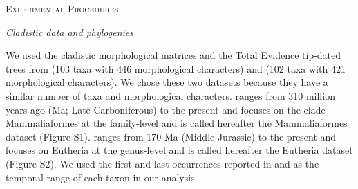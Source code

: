 \documentclass[12pt,letterpaper]{article}
\renewcommand{\section}[1]{%
\bigskip
\begin{center}
\begin{Large}
\normalfont\scshape #1
\medskip
\end{Large}
\end{center}}
\renewcommand{\subsection}[1]{%
\bigskip
\begin{center}
\begin{large}
\normalfont\itshape #1
\end{large}
\end{center}}
\begin{document}
%
%

\section{Experimental Procedures}

\subsection{Cladistic data and phylogenies}
We used the cladistic morphological matrices and the Total Evidence tip-dated trees \cite{ronquista2012} from \cite{Slater2012MEE} (103 taxa with 446 morphological characters) and \cite{beckancient2014} (102 taxa with 421 morphological characters).
We chose these two datasets because they have a similar number of taxa and morphological characters.
\cite{Slater2012MEE} ranges from 310 million years ago (Ma; Late Carboniferous) to the present and focuses on the clade Mammaliaformes at the family-level and is called hereafter the Mammaliaformes dataset (Figure S1).
\cite{beckancient2014} ranges from 170 Ma (Middle Jurassic) to the present and focuses on Eutheria at the genus-level and is called hereafter the Eutheria dataset (Figure S2).
We used the first and last occurrences reported in \cite{Slater2012MEE} and \cite{beckancient2014} as the temporal range of each taxon in our analysis.
\end{document}
